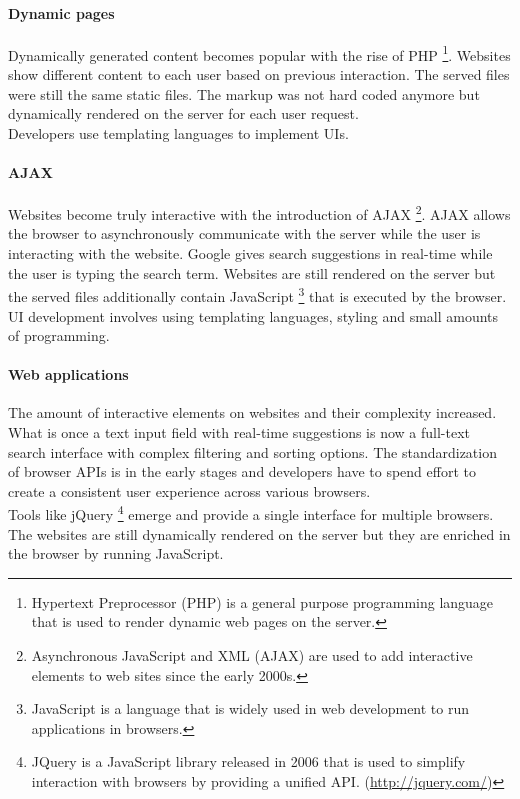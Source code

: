 \paragraph{Dynamic pages} Dynamically generated content becomes popular with the rise of PHP \footnote{Hypertext Preprocessor (PHP) is a general purpose programming language that is used to render dynamic web pages on the server.}. Websites show different content to each user based on previous interaction. The served files were still the same static files. The markup was not hard coded anymore but dynamically rendered on the server for each user request.
\\ Developers use templating languages to implement UIs.

\paragraph{AJAX} Websites become truly interactive with the introduction of AJAX \footnote{Asynchronous JavaScript and XML (AJAX) are used to add interactive elements to web sites since the early 2000s.}. AJAX allows the browser to asynchronously communicate with the server while the user is interacting with the website. Google gives search suggestions in real-time while the user is typing the search term. Websites are still rendered on the server but the served files additionally contain JavaScript \footnote{JavaScript is a language that is widely used in web development to run applications in browsers.} that is executed by the browser.
\\ UI development involves using templating languages, styling and small amounts of programming.

\paragraph{Web applications} The amount of interactive elements on websites and their complexity increased. What is once a text input field with real-time suggestions is now a full-text search interface with complex filtering and sorting options. The standardization of browser APIs is in the early stages and developers have to spend effort to create a consistent user experience across various browsers.
\\ Tools like jQuery \footnote{JQuery is a JavaScript library released in 2006 that is used to simplify interaction with browsers by providing a unified API. (\url{http://jquery.com/})} emerge and provide a single interface for multiple browsers. The websites are still dynamically rendered on the server but they are enriched in the browser by running JavaScript.

